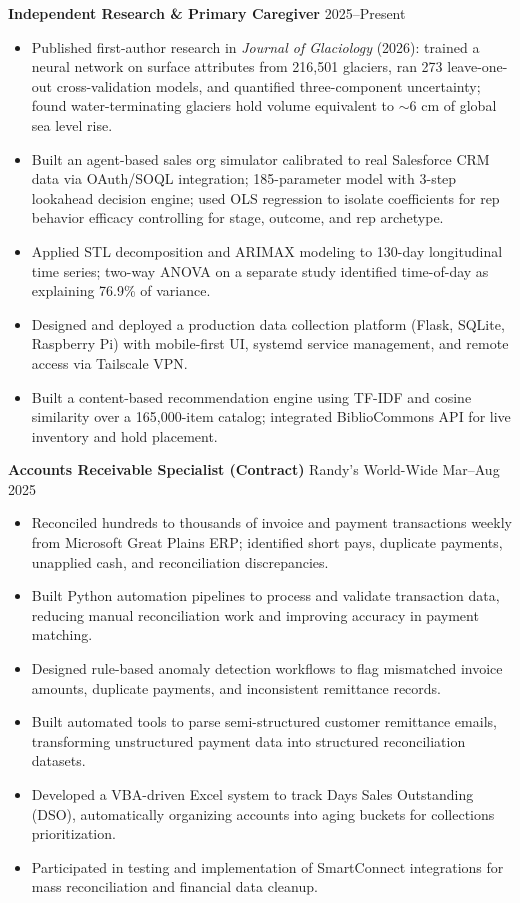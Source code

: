 \documentclass[11pt,a4paper]{article}
\begin{document}
\noindent
\textbf{Independent Research \& Primary Caregiver} \hfill 2025--Present
\begin{itemize}
    \item Published first-author research in \textit{Journal of Glaciology} (2026): trained a neural network on surface attributes from 216,501 glaciers, ran 273 leave-one-out cross-validation models, and quantified three-component uncertainty; found water-terminating glaciers hold volume equivalent to $\sim$6 cm of global sea level rise.
    \item Built an agent-based sales org simulator calibrated to real Salesforce CRM data via OAuth/SOQL integration; 185-parameter model with 3-step lookahead decision engine; used OLS regression to isolate coefficients for rep behavior efficacy controlling for stage, outcome, and rep archetype.
    \item Applied STL decomposition and ARIMAX modeling to 130-day longitudinal time series; two-way ANOVA on a separate study identified time-of-day as explaining 76.9\% of variance.
    \item Designed and deployed a production data collection platform (Flask, SQLite, Raspberry Pi) with mobile-first UI, systemd service management, and remote access via Tailscale VPN.
    \item Built a content-based recommendation engine using TF-IDF and cosine similarity over a 165,000-item catalog; integrated BiblioCommons API for live inventory and hold placement.
\end{itemize}

\vspace{0.2cm}
\noindent
\textbf{Accounts Receivable Specialist (Contract)} \hfill Randy's World-Wide \hfill Mar--Aug 2025
\begin{itemize}
    \item Reconciled hundreds to thousands of invoice and payment transactions weekly from Microsoft Great Plains ERP; identified short pays, duplicate payments, unapplied cash, and reconciliation discrepancies.
    \item Built Python automation pipelines to process and validate transaction data, reducing manual reconciliation work and improving accuracy in payment matching.
    \item Designed rule-based anomaly detection workflows to flag mismatched invoice amounts, duplicate payments, and inconsistent remittance records.
    \item Built automated tools to parse semi-structured customer remittance emails, transforming unstructured payment data into structured reconciliation datasets.
    \item Developed a VBA-driven Excel system to track Days Sales Outstanding (DSO), automatically organizing accounts into aging buckets for collections prioritization.
    \item Participated in testing and implementation of SmartConnect integrations for mass reconciliation and financial data cleanup.
\end{itemize}
\end{document}

